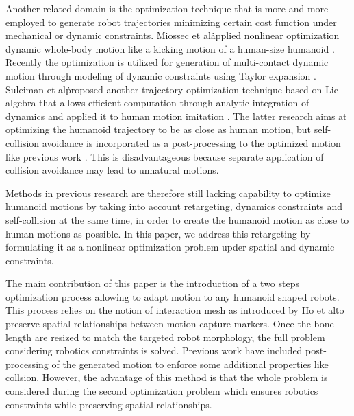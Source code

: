 \documentclass[letterpaper, 10 pt, conference]{ieeeconf}  %
\begin{document}
Another related domain is the optimization technique that is more and
more employed to generate robot trajectories minimizing certain cost
function under mechanical or dynamic constraints. Miossec et
al\. applied nonlinear optimization dynamic whole-body motion like a
kicking motion of a human-size humanoid \cite{Miossec06ROBIO}.
Recently the optimization is utilized for generation of multi-contact
dynamic motion through modeling of dynamic constraints using Taylor
expansion \cite{Lengagne13IJRR}. Suleiman et al\. proposed another
trajectory optimization technique based on Lie algebra that allows
efficient computation through analytic integration of dynamics
\cite{Suleiman07Humanoids} and applied it to human motion imitation
\cite{Suleiman08ICRA}.  The latter research aims at optimizing the
humanoid trajectory to be as close as human motion, but self-collision
avoidance is incorporated as a post-processing to the optimized motion
like previous work \cite{Nakaoka12Humanoids}. This is disadvantageous
because separate application of collision avoidance may lead to
unnatural motions.


Methods in previous research are therefore still lacking capability to
optimize humanoid motions by taking into account retargeting, dynamics
constraints and self-collision at the same time, in order to create
the humanoid motion as close to human motions as possible. In this
paper, we address this retargeting by formulating it as a nonlinear
optimization problem upder spatial and dynamic constraints.


The main contribution of this paper is the introduction of a two steps
optimization process allowing to adapt motion to any humanoid shaped
robots. This process relies on the notion of interaction mesh as
introduced by Ho et al\. to preserve spatial relationships between
motion capture markers. Once the bone length are resized to match the
targeted robot morphology, the full problem considering robotics
constraints is solved. Previous work have included post-processing of
the generated motion to enforce some additional properties like
collsion. However, the advantage of this method is that the whole
problem is considered during the second optimization problem which
ensures robotics constraints while preserving spatial relationships.
\end{document}
